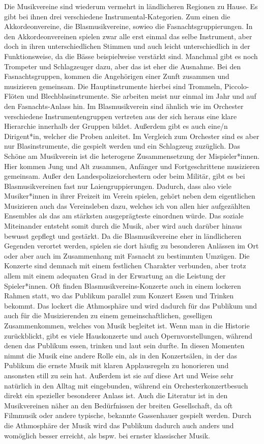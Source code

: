 Die Musikvereine sind wiederum vermehrt in ländlicheren Regionen zu Hause.
Es gibt bei ihnen drei verschiedene Instrumental-Kategorien. Zum einen die
Akkordeonvereine, die Blasmusikvereine, sowieo die Fasnachtsgruppierungen. In
den Akkordeonvereinen spielen zwar alle erst einmal das selbe Instrument, aber
doch in ihren unterschiedlichen Stimmen und auch leicht unterschiedlich in der
Funktionsweise, da die Bässe beispielweise verstärkt sind. Manchmal gibt es noch
Trompeter und Schlagzeuger dazu, aber das ist eher die Ausnahme. Bei den
Fasnachtsgruppen, kommen die Angehörigen einer Zunft zusammen und musizieren
gemeinsam. Die Hauptinstrumente hierbei sind Trommeln, Piccolo-Flöten und
Blechblasinstrumente. Sie arbeiten meist nur einmal im Jahr und auf den
Fasnachts-Anlass hin. Im Blasmusikverein sind ähnlich wie im Orchester
verschiedene Instrumentengruppen vertreten aus der sich heraus eine klare
Hierarchie innerhalb der Gruppen bildet. Außerdem gibt es auch eine/n
Dirigent*in, welcher die Proben anleitet. Im Vergleich zum Orchester sind es aber
nur Blasinstrumente, die gespielt werden und ein Schlagzeug zuzüglich. Das
Schöne am Musikverein ist die heterogene Zusammensetzung der Mispieler*innen.
Hier kommen Jung und Alt zusammen, Anfänger und Fortgeschrittene musizieren
gemeinsam. Außer den Landespolizeiorchestern oder beim Militär, gibt es bei
Blasmusikvereinen fast nur Laiengruppierungen. Dadurch, dass also viele
Musiker*innen in ihrer Freizeit im Verein spielen, gehört neben dem eigentlichen
Musizieren auch das Vereinsleben dazu, welches ich von allen hier aufgezählten
Ensembles als das am stärksten ausgeprägteste einordnen würde. Das soziale
Miteinander entsteht somit durch die Musik, aber wird auch darüber hinaus
bewusst gepflegt und gestärkt. Da die Blasmusikvereine eher in ländlicheren
Gegenden verortet werden, spielen sie dort häufig zu besonderen Anlässen im Ort
oder aber auch im Zusammenhang mit Fasnacht zu bestimmten Umzügen. Die Konzerte
sind demnach mit einem festlichen Charakter verbunden, aber trotz allem mit
einem adequaten Grad in der Erwartung an die Leistung der Spieler*innen. Oft
finden Blasmusikvereins-Konzerte auch in einem lockeren Rahmen statt, wo das Publikum
parallel zum Konzert Essen und Trinken bekommt. Das lockert die
Athmosphäre und wird dadurch für das Publikum und auch für die
Musizierenden zu einem gemeinschaftlichen, geselligen Zusammenkommen, welches
von Musik begleitet ist. Wenn man in die Historie zurückblickt, gibt es viele
Hauskonzerte und auch Opernvorstellungen, während denen das Publikum essen,
trinken und laut sein durfte. In diesen Momenten nimmt die Musik eine andere
Rolle ein, als in den Konzertsälen, in der das Publikum die ernste Musik mit
klaren Applausregeln zu honorieren und ansonsten still zu sein hat. Außerdem ist
sie auf diese Art und Weise sehr natürlich in den Alltag mit eingebunden,
während ein Orchesterkonzertbesuch direkt ein spezieller besonderer Anlass ist.
Auch die Literatur ist in den Musikvereinen näher an den Bedürfnissen der
breiten Gesellschaft, da oft Filmmusik oder andere typische, bekannte
Gassenhauer gespielt werden. Durch die Athmosphäre der Musik wird das Publikum
dadurch auch anders und womöglich besser erreicht, als bspw. bei ernster
klassischer Musik. 




